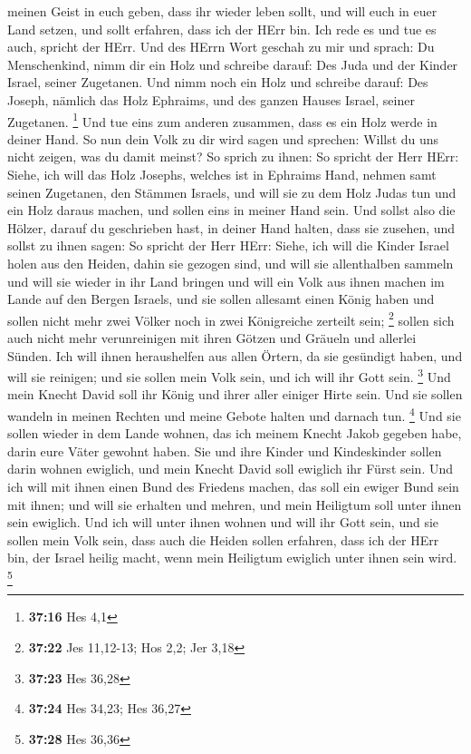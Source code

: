 meinen Geist in euch geben, dass ihr wieder leben sollt, und will euch
in euer Land setzen, und sollt erfahren, dass ich der HErr bin. Ich rede
es und tue es auch, spricht der HErr.  Und des HErrn Wort
geschah zu mir und sprach:  Du Menschenkind, nimm dir ein
Holz und schreibe darauf: Des Juda und der Kinder Israel, seiner
Zugetanen. Und nimm noch ein Holz und schreibe darauf: Des Joseph,
nämlich das Holz Ephraims, und des ganzen Hauses Israel, seiner
Zugetanen. \footnote{\textbf{37:16} Hes 4,1}  Und tue
eins zum anderen zusammen, dass es ein Holz werde in deiner Hand.
 So nun dein Volk zu dir wird sagen und sprechen: Willst
du uns nicht zeigen, was du damit meinst?  So sprich zu
ihnen: So spricht der Herr HErr: Siehe, ich will das Holz Josephs,
welches ist in Ephraims Hand, nehmen samt seinen Zugetanen, den Stämmen
Israels, und will sie zu dem Holz Judas tun und ein Holz daraus machen,
und sollen eins in meiner Hand sein.  Und sollst also die
Hölzer, darauf du geschrieben hast, in deiner Hand halten, dass sie
zusehen,  und sollst zu ihnen sagen: So spricht der Herr
HErr: Siehe, ich will die Kinder Israel holen aus den Heiden, dahin sie
gezogen sind, und will sie allenthalben sammeln und will sie wieder in
ihr Land bringen  und will ein Volk aus ihnen machen im
Lande auf den Bergen Israels, und sie sollen allesamt einen König haben
und sollen nicht mehr zwei Völker noch in zwei Königreiche zerteilt
sein; \footnote{\textbf{37:22} Jes 11,12-13; Hos 2,2; Jer 3,18}
 sollen sich auch nicht mehr verunreinigen mit ihren
Götzen und Gräueln und allerlei Sünden. Ich will ihnen heraushelfen aus
allen Örtern, da sie gesündigt haben, und will sie reinigen; und sie
sollen mein Volk sein, und ich will ihr Gott sein. \footnote{\textbf{37:23}
  Hes 36,28}  Und mein Knecht David soll ihr König und
ihrer aller einiger Hirte sein. Und sie sollen wandeln in meinen Rechten
und meine Gebote halten und darnach tun. \footnote{\textbf{37:24} Hes
  34,23; Hes 36,27}  Und sie sollen wieder in dem Lande
wohnen, das ich meinem Knecht Jakob gegeben habe, darin eure Väter
gewohnt haben. Sie und ihre Kinder und Kindeskinder sollen darin wohnen
ewiglich, und mein Knecht David soll ewiglich ihr Fürst sein.
 Und ich will mit ihnen einen Bund des Friedens machen,
das soll ein ewiger Bund sein mit ihnen; und will sie erhalten und
mehren, und mein Heiligtum soll unter ihnen sein ewiglich.
 Und ich will unter ihnen wohnen und will ihr Gott sein,
und sie sollen mein Volk sein,  dass auch die Heiden
sollen erfahren, dass ich der HErr bin, der Israel heilig macht, wenn
mein Heiligtum ewiglich unter ihnen sein wird. \footnote{\textbf{37:28}
  Hes 36,36}

